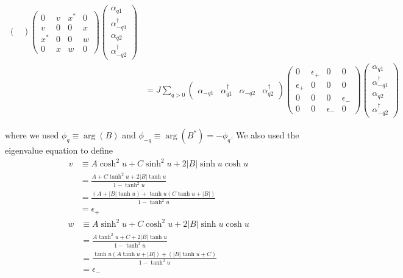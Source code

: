 \documentclass{article}
\begin{document}
\begin{tiny}
\begin{align}
\begin{pmatrix}
	\end{pmatrix} \begin{pmatrix}
		0 & v & x^* & 0 \\
		v & 0 & 0 & x \\
		x^* & 0 & 0 & w \\
		0 & x & w & 0
	\end{pmatrix} \begin{pmatrix}
		\alpha_{q1} \\ \alpha_{-q1}^\dagger \\ \alpha_{q2} \\ \alpha_{-q2}^\dagger
	\end{pmatrix} \nonumber \\
%
	&= J \sum_{q>0} \begin{pmatrix}
		\alpha_{-q1} & \alpha_{q1}^\dagger & \alpha_{-q2} & \alpha_{q2}^\dagger
	\end{pmatrix} \begin{pmatrix}
		0 & \epsilon_+ & 0 & 0 \\
		\epsilon_+ & 0 & 0 & 0 \\
		0 & 0 & 0 & \epsilon_- \\
		0 & 0 & \epsilon_- & 0
	\end{pmatrix} \begin{pmatrix}
		\alpha_{q1} \\ \alpha_{-q1}^\dagger \\ \alpha_{q2} \\ \alpha_{-q2}^\dagger
	\end{pmatrix} \nonumber
\end{align}
\end{tiny}
where we used $\phi_q \equiv \operatorname{arg}(B)$ and $\phi_{-q} \equiv \operatorname{arg}(B^*) = -\phi_q$.
We also used the eigenvalue equation to define
\begin{align}
	v &\equiv A \cosh^2 u + C \sinh^2 u + 2|B| \sinh u \cosh u \\
	&= \frac{A + C \tanh^2 u + 2|B| \tanh u}{1 - \tanh^2 u} \\
	&= \frac{(A + |B| \tanh u) + \tanh u (C \tanh u + |B|)}{1 - \tanh^2 u} \\
	&= \epsilon_+
\end{align}
\begin{align}	
	w &\equiv A \sinh^2 u + C \cosh^2 u + 2|B| \sinh u \cosh u \\
	&= \frac{A \tanh^2 u + C + 2|B| \tanh u}{1 - \tanh^2 u} \\
	&= \frac{\tanh u (A \tanh u + |B|) + (|B| \tanh u + C)}{1 - \tanh^2 u} \\
	&= \epsilon_-
\end{align}
\end{document}
